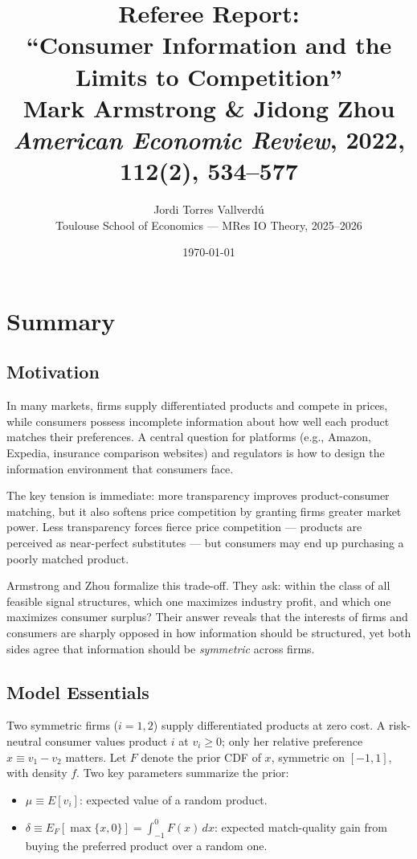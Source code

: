 \documentclass[12pt, a4paper]{article}
\title{\textbf{Referee Report: \\ ``Consumer Information and the Limits to Competition''} \\[6pt]
\large Mark Armstrong \& Jidong Zhou \\
\textit{American Economic Review}, 2022, 112(2), 534--577}
\author{Jordi Torres Vallverd\'{u} \\
\small Toulouse School of Economics --- MRes IO Theory, 2025--2026}
\date{\today}
\begin{document}
\maketitle
\thispagestyle{empty}

\section{Summary}

\subsection{Motivation}

In many markets, firms supply differentiated products and compete in prices, while consumers possess incomplete information about how well each product matches their preferences. A central question for platforms (e.g., Amazon, Expedia, insurance comparison websites) and regulators is how to design the information environment that consumers face.

The key tension is immediate: more transparency improves product-consumer matching, but it also softens price competition by granting firms greater market power. Less transparency forces fierce price competition --- products are perceived as near-perfect substitutes --- but consumers may end up purchasing a poorly matched product.

Armstrong and Zhou formalize this trade-off. They ask: within the class of all feasible signal structures, which one maximizes industry profit, and which one maximizes consumer surplus? Their answer reveals that the interests of firms and consumers are sharply opposed in how information should be structured, yet both sides agree that information should be \emph{symmetric} across firms.

\subsection{Model Essentials}

Two symmetric firms ($i = 1,2$) supply differentiated products at zero cost. A risk-neutral consumer values product $i$ at $v_i \geq 0$; only her relative preference $x \equiv v_1 - v_2$ matters. Let $F$ denote the prior CDF of $x$, symmetric on $[-1,1]$, with density $f$. Two key parameters summarize the prior:
\begin{itemize}[nosep]
    \item $\mu \equiv E[v_i]$: expected value of a random product.
    \item $\delta \equiv E_F[\max\{x,0\}] = \int_{-1}^{0} F(x)\,dx$: expected match-quality gain from buying the preferred product over a random one.
\end{itemize}
\end{document}
